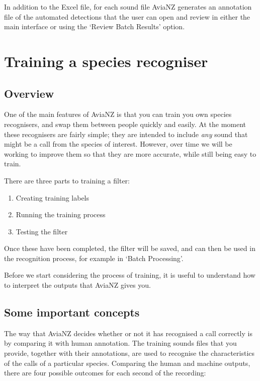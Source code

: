 \documentclass{article}
\begin{document}
In addition to the Excel file, for each sound file AviaNZ generates an annotation file of the automated detections that  the user can open and review in either the main interface or using the `Review Batch Results' option. 

\section{Training a species recogniser}\label{sec:trainfilter}

\subsection{Overview}

One of the main features of AviaNZ is that you can train you own species recognisers, and swap them between people quickly and easily. At the moment these recognisers are fairly simple; they are intended to include {\em any} sound that might be a call from the species of interest. However, over time we will be working to improve them so that they are more accurate, while still being easy to train. 

There are three parts to training a filter:

\begin{enumerate}
\item Creating training labels
\item Running the training process
\item Testing the filter
\end{enumerate}

Once these have been completed, the filter will be saved, and can then be used in the recognition process, for example in `Batch Processing'. 

Before we start considering the process of training, it is useful to understand how to interpret the outputs that AviaNZ gives you. 

\subsection{Some important concepts}\label{sec:metrics}

The way that AviaNZ decides whether or not it has recognised a call correctly is by comparing it with human annotation. The training sounds files that you provide, together with their annotations, are used to recognise the characteristics of the calls of a particular species. Comparing the human and machine outputs, there are four possible outcomes for each second of the recording:
\end{document}
